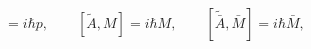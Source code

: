 \begin{equation}
[\tilde{q},p]=i\hbar p, \qquad [\tilde{A},M]=i\hbar M, \qquad
[\tilde{\bar{A}},\bar{M}]=i\hbar \bar{M},
\end{equation}

